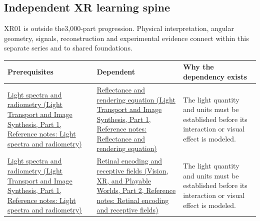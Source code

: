 \subsection{Independent XR learning spine}\label{appendix-4ad47bdd269a-independent-xr-learning-spine}

\hypertarget{appendix-4ad47bdd269a-independent-xr-learning-spine}{}

XR01 is outside the3,000-part progression. Physical interpretation, angular geometry, signals, reconstruction and experimental evidence connect within this separate series and to shared foundations.

{\def\LTcaptype{none} %
\begin{longtable}[]{@{}
  >{\raggedright\arraybackslash}p{}
  >{\raggedright\arraybackslash}p{}
  >{\raggedright\arraybackslash}p{}@{}}
\toprule\noalign{}
\begin{minipage}[b]{\linewidth}\raggedright
Prerequisites
\end{minipage} & \begin{minipage}[b]{\linewidth}\raggedright
Dependent
\end{minipage} & \begin{minipage}[b]{\linewidth}\raggedright
Why the dependency exists
\end{minipage} \\
\midrule\noalign{}
\endhead
\bottomrule\noalign{}
\endlastfoot
\href{../04-Light-Transport-and-Image-Synthesis-P01/main.pdf\#nameddest=appendix-215c2570199b}{Light spectra and radiometry (Light Transport and Image Synthesis, Part 1, Reference notes: Light spectra and radiometry)} & \href{../04-Light-Transport-and-Image-Synthesis-P01/main.pdf\#nameddest=appendix-96da0b153b77}{Reflectance and rendering equation (Light Transport and Image Synthesis, Part 1, Reference notes: Reflectance and rendering equation)} & The light quantity and units must be established before its interaction or visual effect is modeled. \\
\href{../04-Light-Transport-and-Image-Synthesis-P01/main.pdf\#nameddest=appendix-215c2570199b}{Light spectra and radiometry (Light Transport and Image Synthesis, Part 1, Reference notes: Light spectra and radiometry)} & \href{../07-Vision-XR-and-Playable-Worlds-P02/main.pdf\#nameddest=appendix-7281c15ac44a}{Retinal encoding and receptive fields (Vision, XR, and Playable Worlds, Part 2, Reference notes: Retinal encoding and receptive fields)} & The light quantity and units must be established before its interaction or visual effect is modeled. \\

\end{longtable}}
